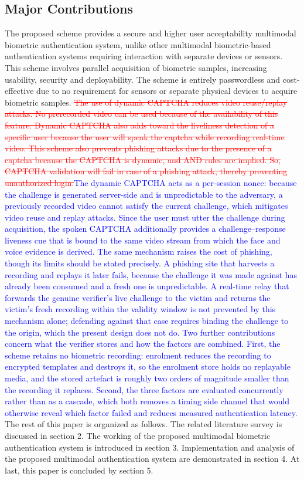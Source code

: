 \documentclass[10pt,journal,compsoc]{IEEEtran}
\begin{document}
 \subsection{Major Contributions}\label{sec:contrib}
 The proposed scheme provides a secure and higher user acceptability multimodal biometric authentication system, unlike other multimodal biometric-based authentication systems requiring interaction with separate devices or sensors. This scheme involves parallel acquisition of biometric samples, increasing usability, security and deployability. The scheme is entirely passwordless and cost-effective due to no requirement for sensors or separate physical devices to acquire biometric samples. \textcolor{red}{\sout{The use of dynamic CAPTCHA reduces video reuse/replay attacks. No prerecorded video can be used because of the availability of this feature. Dynamic CAPTCHA also adds toward the liveliness detection of a specific user because the user will speak the captcha while recording real-time video. This scheme also prevents phishing attacks due to the presence of a captcha because the CAPTCHA is dynamic, and AND rules are implied. So, CAPTCHA validation will fail in case of a phishing attack, thereby preventing unauthorized login.}}\textcolor{blue}{The dynamic CAPTCHA acts as a per-session nonce: because the challenge is generated server-side and is unpredictable to the adversary, a previously recorded video cannot satisfy the current challenge, which mitigates video reuse and replay attacks. Since the user must utter the challenge during acquisition, the spoken CAPTCHA additionally provides a challenge--response liveness cue that is bound to the same video stream from which the face and voice evidence is derived. The same mechanism raises the cost of phishing, though its limits should be stated precisely. A phishing site that harvests a recording and replays it later fails, because the challenge it was made against has already been consumed and a fresh one is unpredictable. A real-time relay that forwards the genuine verifier's live challenge to the victim and returns the victim's fresh recording within the validity window is not prevented by this mechanism alone; defending against that case requires binding the challenge to the origin, which the present design does not do. Two further contributions concern what the verifier stores and how the factors are combined. First, the scheme retains no biometric recording: enrolment reduces the recording to encrypted templates and destroys it, so the enrolment store holds no replayable media, and the stored artefact is roughly two orders of magnitude smaller than the recording it replaces. Second, the three factors are evaluated concurrently rather than as a cascade, which both removes a timing side channel that would otherwise reveal which factor failed and reduces measured authentication latency.}
 The rest of this paper is organized as follows. The related literature survey is discussed in section 2. The working of the proposed multimodal biometric authentication system is introduced in section 3. Implementation and analysis of the proposed multimodal authentication system are demonstrated in section 4. At last, this paper is concluded by section 5.
\end{document}
